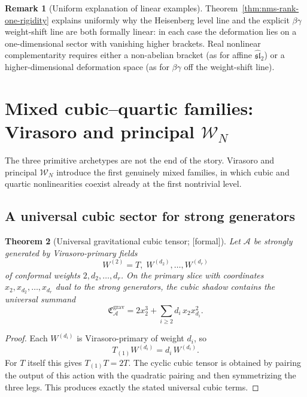 \documentclass[11pt,oneside]{memoir}
\numberwithin{equation}{chapter}
\newtheorem{theorem}{Theorem}[chapter]
\theoremstyle{definition}
\newtheorem{remark}[theorem]{Remark}
\newcommand{\ClaimStatusProvedHere}{\textnormal{[formal]}}
\newcommand{\cA}{\mathcal A}
\begin{document}
\begin{remark}[Uniform explanation of linear examples]
\label{rem:nms-uniform-linearity}
Theorem~\ref{thm:nms-rank-one-rigidity} explains uniformly why the Heisenberg level line and the explicit $\beta\gamma$ weight-shift line are both formally linear: in each case the deformation lies on a one-dimensional sector with vanishing higher brackets.  Real nonlinear complementarity requires either a non-abelian bracket (as for affine $\widehat{\mathfrak{sl}}_2$) or a higher-dimensional deformation space (as for $\beta\gamma$ off the weight-shift line).
\end{remark}

\section{Mixed cubic--quartic families: Virasoro and principal \texorpdfstring{$\mathcal W_N$}{WN}}
\label{sec:nms-mixed-families}

The three primitive archetypes are not the end of the story.  Virasoro and principal $\mathcal W_N$ introduce the first genuinely mixed families, in which cubic and quartic nonlinearities coexist already at the first nontrivial level.

\subsection{A universal cubic sector for strong generators}
\label{subsec:nms-universal-cubic-sector}

\begin{theorem}[Universal gravitational cubic tensor; \ClaimStatusProvedHere]
\label{thm:nms-universal-gravitational-cubic}
Let $\cA$ be strongly generated by Virasoro-primary fields
\[
W^{(2)}=T,\;W^{(d_2)},\dots,W^{(d_r)}
\]
of conformal weights $2,d_2,\dots,d_r$.  On the primary slice with coordinates $x_2,x_{d_2},\dots,x_{d_r}$ dual to the strong generators, the cubic shadow contains the universal summand
\begin{equation}
\label{eq:nms-universal-gravitational-cubic}
\mathfrak C^{\mathrm{grav}}_{\cA}
=
2x_2^3+\sum_{i\ge 2} d_i\,x_2x_{d_i}^2.
\end{equation}
\end{theorem}

\begin{proof}
Each $W^{(d_i)}$ is Virasoro-primary of weight $d_i$, so
\[
T_{(1)}W^{(d_i)}=d_i\,W^{(d_i)}.
\]
For $T$ itself this gives $T_{(1)}T=2T$.  The cyclic cubic tensor is obtained by pairing the output of this action with the quadratic pairing and then symmetrizing the three legs.  This produces exactly the stated universal cubic terms.\qedhere
\end{proof}
\end{document}

